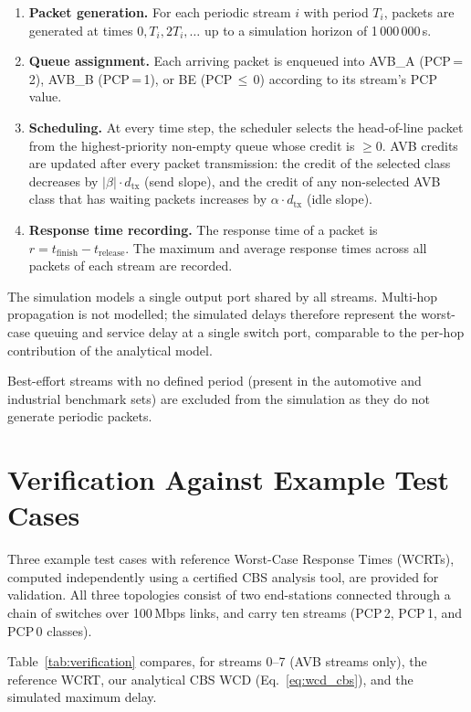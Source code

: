 \begin{enumerate}
    \item \textbf{Packet generation.} For each periodic stream $i$ with period $T_i$, packets are generated at times $0, T_i, 2T_i, \ldots$ up to a simulation horizon of 1\,000\,000\,\textmu s.
    \item \textbf{Queue assignment.} Each arriving packet is enqueued into AVB\_A (PCP\,=\,2), AVB\_B (PCP\,=\,1), or BE (PCP\,$\leq$\,0) according to its stream's PCP value.
    \item \textbf{Scheduling.} At every time step, the scheduler selects the head-of-line packet from the highest-priority non-empty queue whose credit is $\geq 0$. AVB credits are updated after every packet transmission: the credit of the selected class decreases by $|\beta| \cdot d_{\mathrm{tx}}$ (send slope), and the credit of any non-selected AVB class that has waiting packets increases by $\alpha \cdot d_{\mathrm{tx}}$ (idle slope).
    \item \textbf{Response time recording.} The response time of a packet is $r = t_{\mathrm{finish}} - t_{\mathrm{release}}$. The maximum and average response times across all packets of each stream are recorded.
\end{enumerate}

The simulation models a single output port shared by all streams. Multi-hop propagation is not modelled; the simulated delays therefore represent the worst-case queuing and service delay at a single switch port, comparable to the per-hop contribution of the analytical model.

Best-effort streams with no defined period (present in the automotive and industrial benchmark sets) are excluded from the simulation as they do not generate periodic packets.

\section{Verification Against Example Test Cases}
\label{sec:verification}

Three example test cases with reference Worst-Case Response Times (WCRTs), computed independently using a certified CBS analysis tool, are provided for validation. All three topologies consist of two end-stations connected through a chain of switches over 100\,Mbps links, and carry ten streams (PCP\,2, PCP\,1, and PCP\,0 classes).

Table~\ref{tab:verification} compares, for streams 0--7 (AVB streams only), the reference WCRT, our analytical CBS WCD (Eq.~\ref{eq:wcd_cbs}), and the simulated maximum delay.

